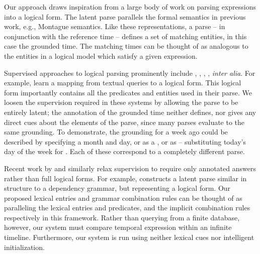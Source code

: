 Our approach draws inspiration from a large body of work
	on parsing expressions into a logical form.
The latent parse parallels the formal semantics in previous work,
	e.g., Montague semantics.
Like these representations, a parse -- in conjunction with
	the reference time -- defines a set of
	matching entities, in this case the grounded time.
The matching times can be thought of as analogous to the entities
	in a logical model which satisfy a given expression.


Supervised approaches to logical parsing prominently include
	,
	,
	, 
	, 
	\textit{inter alia}.
For example,  learn a mapping from
	textual queries to a logical form.
This logical form importantly contains all the predicates and entities
	used in their parse.
We loosen the supervision required in these systems by allowing the parse to
	be entirely latent;
	the annotation of the grounded time neither defines, nor gives any
	direct cues about the elements of the parse, since many parses evaluate
	to the same grounding.
To demonstrate, the grounding for a week ago could be
	described by specifying a month and day, or as a , or as  -- substituting today's day of the week for .
Each of these correspond to a completely different parse.

Recent work by  and 
	 similarly relax supervision 
	to require only annotated answers rather than full logical forms.
For example,  constructs a latent parse
	similar in structure to a dependency grammar, but representing a logical
	form.
Our proposed lexical entries and grammar combination rules can be thought of as
	paralleling the lexical entries and predicates, and the implicit combination 
	rules respectively in this framework.
Rather than querying from a finite database, however, our system must compare
	temporal expression within an infinite timeline.
Furthermore, our system is run using neither lexical cues nor intelligent
	initialization.

